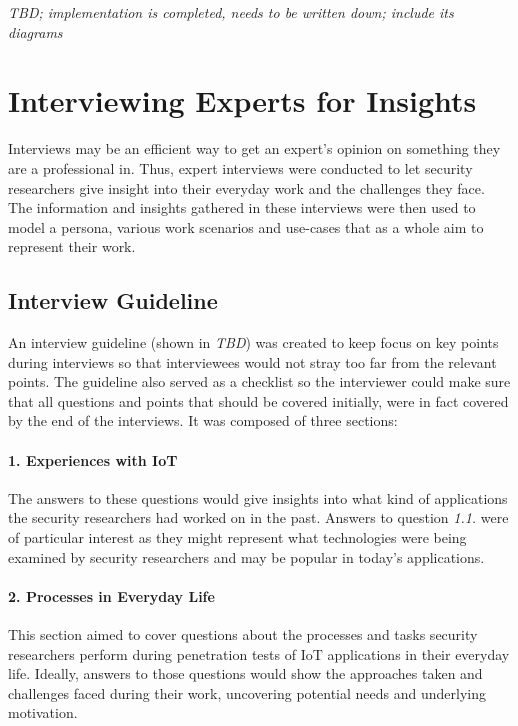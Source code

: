 


\emph{TBD; implementation is completed, needs to be written down; include its diagrams} %

\section{Interviewing Experts for Insights}
\label{sec:interviews}
Interviews may be an efficient way to get an expert’s opinion on something they are a professional in. Thus, expert interviews were conducted to let security researchers give insight into their everyday work and the challenges they face. The information and insights gathered in these interviews were then used to model a persona, various work scenarios and use-cases that as a whole aim to represent their work.

\subsection{Interview Guideline}
An interview guideline (shown in \emph{TBD}) %
was created to keep focus on key points during interviews so that interviewees would not stray too far from the relevant points. The guideline also served as a checklist so the interviewer could make sure that all questions and points that should be covered  initially, were in fact covered by the end of the interviews. It was composed of three sections:

\paragraph{1. Experiences with IoT} The answers to these questions would give insights into what kind of applications the security researchers had worked on in the past. Answers to question \emph{1.1.} were of particular interest as they might represent what technologies were being examined by security researchers and may be popular in today’s applications.
\paragraph{2. Processes in Everyday Life} This section aimed to cover questions about the processes and tasks security researchers perform during penetration tests of IoT applications in their everyday life. Ideally, answers to those questions would show the approaches taken and challenges faced during their work, uncovering potential needs and underlying motivation.
